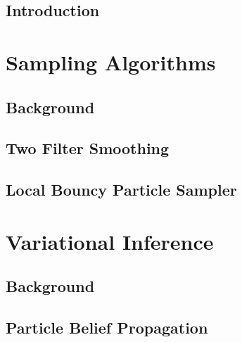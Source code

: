 
\doublespacing
\flushbottom

\chapter{Introduction}\setcounter{page}{1}

\ifintro\fi

\part{Sampling Algorithms} %

\chapter{Background}

\ifbgs\fi

\chapter{Two Filter Smoothing}

\iftfs\fi

\chapter{Local Bouncy Particle Sampler}

\iflbps\fi

\part{Variational Inference} %

\chapter{Background}

\ifbgm\fi

\chapter{Particle Belief Propagation}

